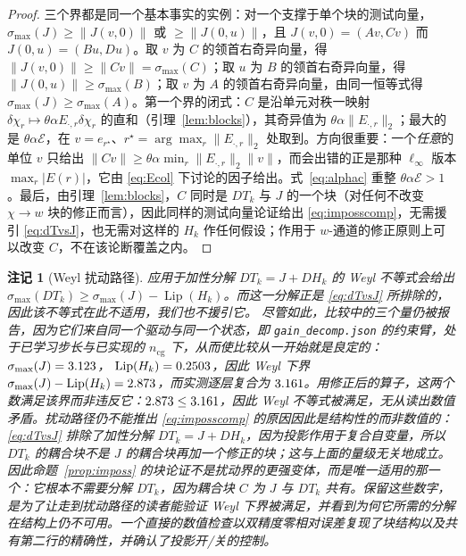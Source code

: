 \documentclass[UTF8,a4paper,11pt]{ctexart}
\newcommand{\norm}[1]{\lVert #1 \rVert}
\newcommand{\numv}[1]{#1}
\newtheorem{Remark}{注记}[section]
\begin{document}
\begin{proof}
三个界都是同一个基本事实的实例：对一个支撑于单个块的测试向量，$\sigma_{\max}(J)\ge\norm{J(v,0)}$ 或 $\ge\norm{J(0,u)}$，且 $J(v,0)=(Av,Cv)$ 而 $J(0,u)=(Bu,Du)$。取 $v$ 为 $C$ 的领首右奇异向量，得 $\norm{J(v,0)}\ge\norm{Cv}=\sigma_{\max}(C)$；取 $u$ 为 $B$ 的领首右奇异向量，得 $\norm{J(0,u)}\ge\sigma_{\max}(B)$；取 $v$ 为 $A$ 的领首右奇异向量，由同一恒等式得 $\sigma_{\max}(J)\ge\sigma_{\max}(A)$。第一个界的闭式：$C$ 是沿单元对秩一映射 $\delta\chi_r\mapsto\theta\alpha E_{\cdot,r}\delta\chi_r$ 的直和（引理~\ref{lem:blocks}），其奇异值为 $\theta\alpha\norm{E_{\cdot,r}}_2$；最大的是 $\theta\alpha\mathcal{E}$，在 $v=e_{r^\star}$、$r^\star=\arg\max_r\norm{E_{\cdot,r}}_2$ 处取到。方向很重要：一个\emph{任意}的单位 $v$ 只给出
$\norm{Cv}\ge\theta\alpha\min_r\norm{E_{\cdot,r}}_2\norm{v}$，而会出错的正是那种 $\ell_\infty$ 版本 $\max_r|E(r)|$，它由 \eqref{eq:Ecol} 下讨论的因子给出。式~\eqref{eq:alphac} 重整 $\theta\alpha\mathcal{E}>1$。最后，由引理~\ref{lem:blocks}，$C$ 同时是 $DT_k$ 与 $J$ 的一个块（对任何不改变 $\chi\!\to\!w$ 块的修正而言），因此同样的测试向量论证给出 \eqref{eq:imposscomp}，无需援引 \eqref{eq:dTvsJ}，也无需对这样的 $H_k$ 作任何假设；作用于 $w$-通道的修正原则上可以改变 $C$，不在该论断覆盖之内。
\end{proof}

\begin{Remark}[Weyl 扰动路径]\label{rem:weyl}
应用于加性分解 $DT_k=J+DH_k$ 的 Weyl 不等式会给出
$\sigma_{\max}(DT_k)\ge\sigma_{\max}(J)-\operatorname{Lip}(H_k)$。而这一分解正是 \eqref{eq:dTvsJ} 所排除的，因此该不等式在此不适用，我们也不援引它。
尽管如此，比较中的三个量仍被报告，因为它们来自\emph{同一个}驱动与\emph{同一个}状态，即 \texttt{gain\_decomp.json} 的约束臂，处于已学习步长与已实现的 $n_{\mathrm{cg}}$ 下，从而使比较从一开始就是良定的：
$\sigma_{\max}(J)=\numv{\NumGdPhysSigma}$，
$\operatorname{Lip}(H_k)=\numv{\NumLipHCons}$，因此 Weyl 下界
$\sigma_{\max}(J)-\operatorname{Lip}(H_k)=\numv{\NumWeylRhs}$，而实测逐层复合为 $\numv{\NumSigCompLayerCons}$。用修正后的算子，这两个数满足该界而非违反它：$\numv{\NumWeylRhs}\le\numv{\NumSigCompLayerCons}$，因此 Weyl 不等式被满足，无从读出数值矛盾。扰动路径仍不能推出 \eqref{eq:imposscomp} 的原因因此是\emph{结构性的}而非数值的：\eqref{eq:dTvsJ} 排除了加性分解 $DT_k=J+DH_k$，因为投影作用于复合自变量，所以 $DT_k$ 的耦合块不是 $J$ 的耦合块再加一个修正的块；这与上面的量级无关地成立。因此命题~\ref{prop:imposs} 的块论证不是扰动界的更强变体，而是唯一适用的那一个：它根本不需要分解 $DT_k$，因为耦合块 $C$ 为 $J$ 与 $DT_k$ 共有。保留这些数字，是为了让走到扰动路径的读者能验证 Weyl 下界被满足，并看到为何它所需的分解在结构上仍不可用。一个直接的数值检查以双精度零相对误差复现了块结构以及共有第二行的精确性，并确认了投影开/关的控制。
\end{Remark}
\end{document}
